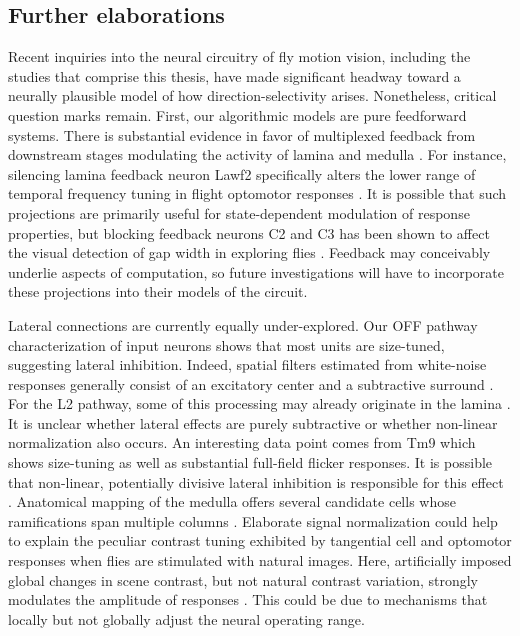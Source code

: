 \subsection{Further elaborations}
Recent inquiries into the neural circuitry of fly motion vision, including the studies that comprise this thesis, have made significant headway toward a neurally plausible model of how direction-selectivity arises. Nonetheless, critical question marks remain. First, our algorithmic models are pure feedforward systems. There is substantial evidence in favor of multiplexed feedback from downstream stages modulating the activity of lamina and medulla \citep{Fischbach:1989uw,Takemura:2017aa}. For instance, silencing lamina feedback neuron Lawf2 specifically alters the lower range of temporal frequency tuning in flight optomotor responses \citep{Tuthill:2014gc}. It is possible that such projections are primarily useful for state-dependent modulation of response properties, but blocking feedback neurons C2 and C3 has been shown to affect the visual detection of gap width in exploring flies \citep{Triphan:2016aa}. Feedback may conceivably underlie aspects of computation, so future investigations will have to incorporate these projections into their models of the circuit.

Lateral connections are currently equally under-explored. Our OFF pathway characterization of input neurons shows that most units are size-tuned, suggesting lateral inhibition. Indeed, spatial filters estimated from white-noise responses generally consist of an excitatory center and a subtractive surround \citep{Arenz:2017aa}. For the L2 pathway, some of this processing may already originate in the lamina \citep{Freifeld:2013gu}. It is unclear whether lateral effects are purely subtractive or whether non-linear normalization also occurs. An interesting data point comes from Tm9 which shows size-tuning as well as substantial full-field flicker responses. It is possible that non-linear, potentially divisive lateral inhibition is responsible for this effect \citep{Carandini:2012fma}. Anatomical mapping of the medulla offers several candidate cells whose ramifications span multiple columns \citep{Fischbach:1989uw}. Elaborate signal normalization could help to explain the peculiar contrast tuning exhibited by tangential cell and optomotor responses when flies are stimulated with natural images. Here, artificially imposed global changes in scene contrast, but not natural contrast variation, strongly modulates the amplitude of responses \citep[see our work as well as][]{Straw:2008hh}. This could be due to mechanisms that locally but not globally adjust the neural operating range.

